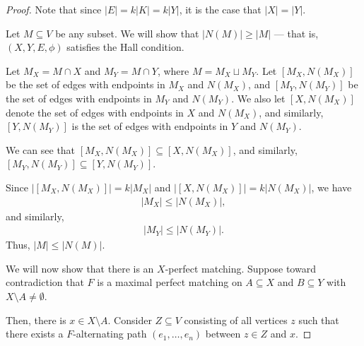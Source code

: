 \begin{proof}
  Note that since $\left\vert E \right\vert = k\left\vert K \right\vert = k\left\vert Y \right\vert$, it is the case that $\left\vert X \right\vert = \left\vert Y \right\vert$.\newline

  Let $M\subseteq V$ be any subset. We will show that $\left\vert N(M) \right\vert\geq \left\vert M \right\vert$ --- that is, $\left(X,Y,E,\phi\right)$ satisfies the Hall condition.\newline

  Let $M_X = M\cap X$ and $M_Y = M\cap Y$, where $M = M_X\sqcup M_Y$. Let $\left[M_X,N\left(M_X\right)\right]$ be the set of edges with endpoints in $M_X$ and $N\left(M_X\right)$, and $\left[M_Y,N\left(M_Y\right)\right]$ be the set of edges with endpoints in $M_Y$ and $N\left(M_Y\right)$. We also let $\left[X,N\left(M_X\right)\right]$ denote the set of edges with endpoints in $X$ and $N\left(M_X\right)$, and similarly, $\left[Y,N\left(M_Y\right)\right]$ is the set of edges with endpoints in $Y$ and $N\left(M_Y\right)$.\newline

  We can see that $\left[M_X,N\left(M_X\right)\right]\subseteq \left[X,N\left(M_X\right)\right]$, and similarly, $\left[M_Y,N\left(M_Y\right)\right]\subseteq \left[Y,N\left(M_Y\right)\right]$.\newline

  Since $\left\vert \left[M_X,N\left(M_X\right)\right] \right\vert = k\left\vert M_X \right\vert$ and $\left\vert \left[X,N\left(M_X\right)\right] \right\vert = k\left\vert N\left(M_X\right) \right\vert$, we have
  \begin{align*}
    \left\vert M_X \right\vert\leq \left\vert N\left(M_X\right) \right\vert,
  \end{align*}
  and similarly,
  \begin{align*}
    \left\vert M_Y \right\vert\leq \left\vert N\left(M_Y\right) \right\vert.
  \end{align*}
  Thus, $\left\vert M \right\vert\leq \left\vert N\left(M\right) \right\vert$.\newline

  We will now show that there is an $X$-perfect matching. Suppose toward contradiction that $F$ is a maximal perfect matching on $A\subseteq X$ and $B\subseteq Y$ with $X\setminus A \neq \emptyset$.\newline

  Then, there is $x\in X\setminus A$. Consider $Z\subseteq V$ consisting of all vertices $z$ such that there exists a $F$-alternating path $\left(e_1,\dots,e_n\right)$ between $z\in Z$ and $x$.\newline


\end{proof}
